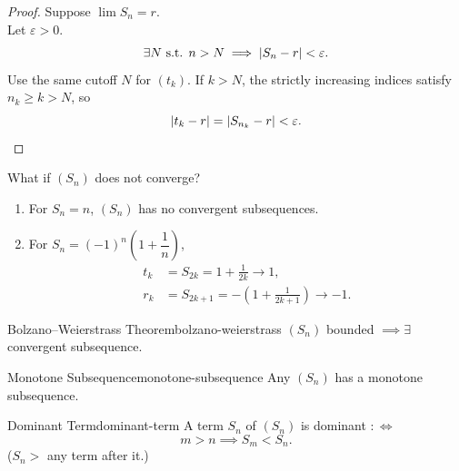 \begin{proof}
  Suppose $\lim S_n=r$.\\
  Let $\varepsilon>0$.
  \[
    \exists N\text{ s.t. }n>N\implies\left\lvert S_n-r \right\rvert<\varepsilon.
  \]
  Use the same cutoff $N$ for $(t_k)$. If $k>N$, the strictly increasing
  indices satisfy $n_k\ge k>N$, so
  \[
    \left\lvert t_k-r \right\rvert=\left\lvert S_{n_k}-r \right\rvert<\varepsilon.\qedhere
  \]
\end{proof}

What if $(S_n)$ does not converge?

\begin{example}
  \begin{enumerate}
    \item For $S_n=n$, $(S_n)$ has no convergent subsequences.
    \item For $S_n=(-1)^n\left(1+\dfrac1n\right)$,
          \begin{align*}
            t_k & =S_{2k}=1+\frac1{2k}\to1,                    \\
            r_k & =S_{2k+1}=-\left(1+\frac1{2k+1}\right)\to-1.
          \end{align*}
  \end{enumerate}
\end{example}

\begin{theorem}{Bolzano--Weierstrass Theorem}{bolzano-weierstrass}
  $(S_n)$ bounded $\implies\exists$ convergent subsequence.
\end{theorem}

\begin{lemma}{Monotone Subsequence}{monotone-subsequence}
  Any $(S_n)$ has a monotone subsequence.
\end{lemma}

\begin{definition}{Dominant Term}{dominant-term}
  A term $S_n$ of $(S_n)$ is dominant $:\iff$
  \[
    m>n\implies S_m<S_n.
  \]
  ($S_n>$ any term after it.)
\end{definition}

